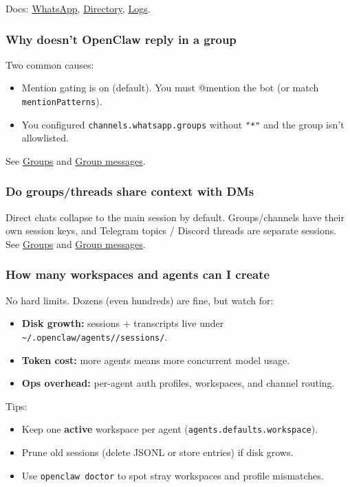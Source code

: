 Docs: \href{/channels/whatsapp}{WhatsApp}, \href{/cli/directory}{Directory}, \href{/cli/logs}{Logs}.

\subsubsection{Why doesn't OpenClaw reply in a group}


Two common causes:

\begin{itemize}
  \item Mention gating is on (default). You must @mention the bot (or match \texttt{mentionPatterns}).
  \item You configured \texttt{channels.whatsapp.groups} without \texttt{"*"} and the group isn't allowlisted.
\end{itemize}


See \href{/channels/groups}{Groups} and \href{/channels/group-messages}{Group messages}.

\subsubsection{Do groups/threads share context with DMs}


Direct chats collapse to the main session by default. Groups/channels have their own session keys, and Telegram topics / Discord threads are separate sessions. See \href{/channels/groups}{Groups} and \href{/channels/group-messages}{Group messages}.

\subsubsection{How many workspaces and agents can I create}


No hard limits. Dozens (even hundreds) are fine, but watch for:

\begin{itemize}
  \item \textbf{Disk growth:} sessions + transcripts live under \texttt{\textasciitilde{}/.openclaw/agents//sessions/}.
  \item \textbf{Token cost:} more agents means more concurrent model usage.
  \item \textbf{Ops overhead:} per-agent auth profiles, workspaces, and channel routing.
\end{itemize}


Tips:

\begin{itemize}
  \item Keep one \textbf{active} workspace per agent (\texttt{agents.defaults.workspace}).
  \item Prune old sessions (delete JSONL or store entries) if disk grows.
  \item Use \texttt{openclaw doctor} to spot stray workspaces and profile mismatches.
\end{itemize}


